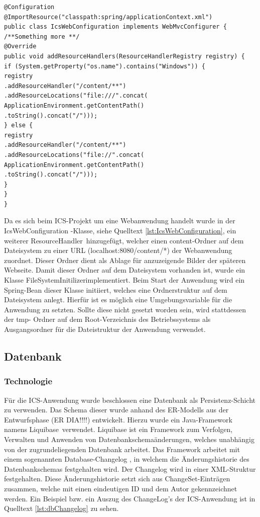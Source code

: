 \lstset{language=Java}
\begin{lstlisting}[caption={IcsWebConfiguration.java}, label={lst:IcsWebConfiguration}]
@Configuration
@ImportResource("classpath:spring/applicationContext.xml")
public class IcsWebConfiguration implements WebMvcConfigurer {
/**Something more **/
@Override
public void addResourceHandlers(ResourceHandlerRegistry registry) {
if (System.getProperty("os.name").contains("Windows")) {
registry
.addResourceHandler("/content/**")
.addResourceLocations("file:///".concat(
ApplicationEnvironment.getContentPath()
.toString().concat("/")));
} else {
registry
.addResourceHandler("/content/**")
.addResourceLocations("file://".concat(
ApplicationEnvironment.getContentPath()
.toString().concat("/")));
}
}
}
\end{lstlisting}

Da es sich beim \ac{ICS}-Projekt um eine Webanwendung handelt wurde in der \glqq IcsWebConfiguration \grqq -Klasse, siehe Quelltext \ref{lst:IcsWebConfiguration}, ein weiterer \glqq ResourceHandler\grqq \, hinzugefügt, welcher einen \glqq content\grqq-Ordner auf dem Dateisystem zu einer URL (\glqq localhost:8080/content/*\grqq) der Webanwendung zuordnet. Dieser Ordner dient als Ablage für anzuzeigende Bilder der späteren Webseite. Damit dieser Ordner auf dem Dateisystem vorhanden ist, wurde ein Klasse \glqq FileSystemInitilizer\grqq implementiert. Beim Start der Anwendung wird ein Spring-Bean dieser Klasse initiiert, welches eine Ordnerstruktur auf dem Dateisystem anlegt. Hierfür ist es möglich eine Umgebungsvariable für die Anwendung zu setzten. Sollte diese nicht gesetzt worden sein, wird stattdessen der \glqq tmp\grqq- Ordner auf dem Root-Verzeichnis des Betriebssystems als Ausgangsordner für die Dateistruktur der Anwendung verwendet.


\subsection{Datenbank}
\subsubsection{Technologie}
Für die \ac{ICS}-Anwendung wurde beschlossen eine Datenbank als Persistenz-Schicht zu verwenden. Das Schema dieser wurde anhand des ER-Modells aus der Entwurfsphase (ER DIA!!!!) entwickelt. Hierzu wurde ein Java-Framework namens \glqq Liquibase\grqq \, verwendet.\autocite{Liquibase} Liquibase ist ein Framework zum Verfolgen, Verwalten und Anwenden von Datenbankschemaänderungen, welches unabhängig von der zugrundeliegenden Datenbank arbeitet. Das Framework arbeitet mit einem sogenannten \glqq Database-Changelog \grqq, in welchem die Änderungshistorie des Datenbankschemas festgehalten wird. Der Changelog wird in einer XML-Struktur festgehalten. Diese Änderungshistorie setzt sich aus \glqq ChangeSet\grqq-Einträgen zusammen, welche mit einen eindeutigen \ac{ID} und dem Autor gekennzeichnet werden. Ein Beispiel bzw. ein Auszug des ChangeLog's der \ac{ICS}-Anwendung ist in Quelltext \ref{lst:dbChangelog} zu sehen.


